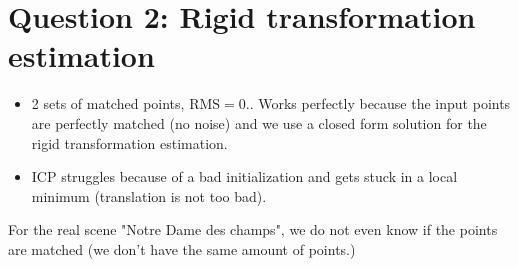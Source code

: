 \documentclass[a4paper]{article}
\begin{document}
\pagebreak

\section{Question 2: Rigid transformation estimation}
\begin{itemize}
  \item 2 sets of matched points, $\text{RMS} = 0.$.
Works perfectly because the input points are perfectly matched (no noise) and we use a closed form solution for the rigid transformation estimation.
  \item ICP struggles because of a bad initialization and gets stuck in a local minimum (translation is not too bad).
\end{itemize}


For the real scene "Notre Dame des champs", we do not even know if the points are matched (we don't have the same amount of points.) 
\end{document}
